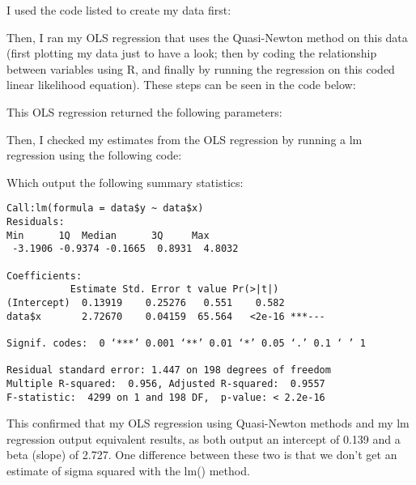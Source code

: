 \documentclass[12pt,letterpaper]{article}
\begin{document}
I used the code listed to create my data first:

 

Then, I ran my OLS regression that uses the Quasi-Newton method on this data (first plotting my data just to have a look; then by coding the relationship between variables using R, and finally by running the regression on this coded linear likelihood equation). These steps can be seen in the code below:
 

This OLS regression returned the following parameters:
 

Then, I checked my estimates from the OLS regression by running a lm regression using the following code:
 
Which output the following summary statistics:
	\begin{verbatim}
Call:lm(formula = data$y ~ data$x)
Residuals:    
Min      1Q  Median      3Q     Max
 -3.1906 -0.9374 -0.1665  0.8931  4.8032
 
Coefficients:            
           Estimate Std. Error t value Pr(>|t|)    
(Intercept)  0.13919    0.25276   0.551    0.582    
data$x       2.72670    0.04159  65.564   <2e-16 ***---

Signif. codes:  0 ‘***’ 0.001 ‘**’ 0.01 ‘*’ 0.05 ‘.’ 0.1 ‘ ’ 1

Residual standard error: 1.447 on 198 degrees of freedom
Multiple R-squared:  0.956,	Adjusted R-squared:  0.9557 
F-statistic:  4299 on 1 and 198 DF,  p-value: < 2.2e-16
\end{verbatim} 

This confirmed that my OLS regression using Quasi-Newton methods and my lm regression output equivalent results, as both output an intercept of 0.139 and a beta (slope) of 2.727. One difference between these two is that we don't get an estimate of sigma squared with the lm() method.
\end{document}
